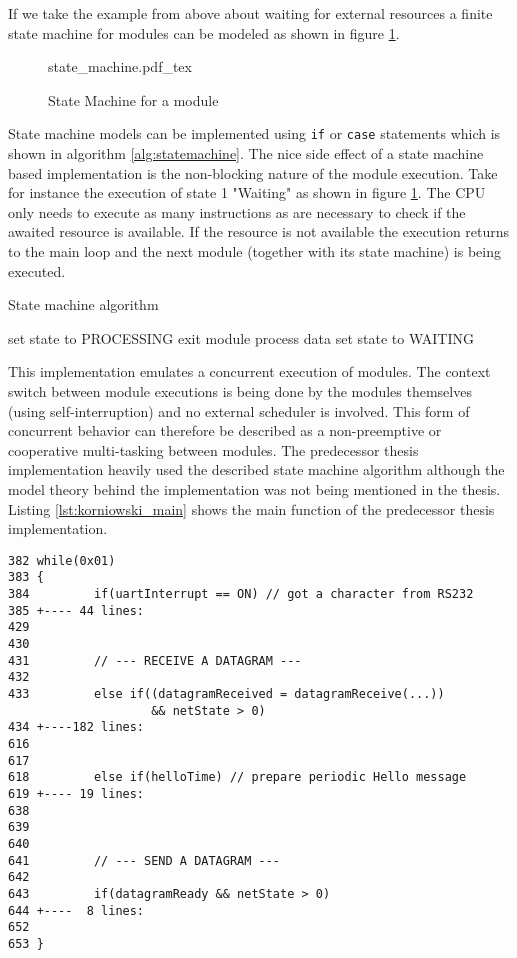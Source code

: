 If we take the example from above about waiting for external resources a finite state machine for modules can be modeled as shown in figure \ref{fig:statemachine}.

\begin{figure}[H]
\centering
{state_machine.pdf_tex}
\caption{State Machine for a module}
\label{fig:statemachine}
\end{figure}

State machine models can be implemented using \texttt{if} or \texttt{case} statements which is shown in algorithm \ref{alg:statemachine}. The nice side effect of a state machine based implementation is the non-blocking nature of the module execution. Take for instance the execution of state 1 "Waiting" as shown in figure \ref{fig:statemachine}. The CPU only needs to execute as many instructions as are necessary to check if the awaited resource is available. If the resource is not available the execution returns to the main loop and the next module (together with its state machine) is being executed.

\begin{algorithm}[H]
\caption{State machine algorithm}
\label{alg:statemachine}
\begin{algorithmic}
        \STATE set state to PROCESSING
    \ELSE
        \STATE exit module
    \ENDIF
{}
    \STATE process data
    \STATE set state to WAITING
\ENDIF
\end{algorithmic}
\end{algorithm}

This implementation emulates a concurrent execution of modules. The context switch between module executions is being done by the modules themselves (using self-interruption) and no external scheduler is involved. This form of concurrent behavior can therefore be described as a non-preemptive or cooperative multi-tasking between modules. The predecessor thesis \cite{korniowski} implementation heavily used the described state machine algorithm although the model theory behind the implementation was not being mentioned in the thesis. Listing \ref{lst:korniowski_main} shows the main function of the predecessor thesis implementation.

\begin{lstlisting}[label=lst:korniowski_main,caption=main function implementation in \cite{korniowski}]
382 while(0x01)
383 {
384         if(uartInterrupt == ON) // got a character from RS232
385 +---- 44 lines: 
429 
430 
431         // --- RECEIVE A DATAGRAM ---
432 
433         else if((datagramReceived = datagramReceive(...)) 
                    && netState > 0)     
434 +----182 lines: 
616 
617     
618         else if(helloTime) // prepare periodic Hello message
619 +---- 19 lines: 
638 
639 
640     
641         // --- SEND A DATAGRAM ---
642     
643         if(datagramReady && netState > 0)
644 +----  8 lines: 
652 
653 }
\end{lstlisting}

